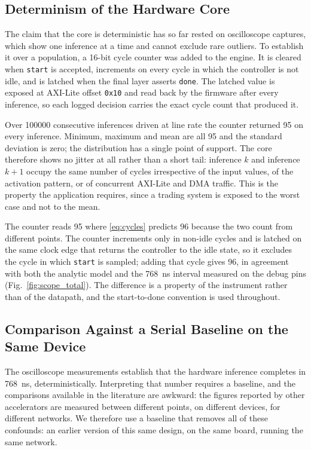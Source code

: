 \documentclass[final,5p,times,twocolumn]{elsarticle}
\begin{document}
\subsection{Determinism of the Hardware Core}
\label{sec:determinism}
The claim that the core is deterministic has so far rested on oscilloscope
captures, which show one inference at a time and cannot exclude rare outliers.
To establish it over a population, a 16-bit cycle counter was added to the
engine. It is cleared when \texttt{start} is accepted, increments on every cycle
in which the controller is not idle, and is latched when the final layer asserts
\texttt{done}. The latched value is exposed at AXI-Lite offset \texttt{0x10} and
read back by the firmware after every inference, so each logged decision carries
the exact cycle count that produced it.

Over \num{100000} consecutive inferences driven at line rate the counter
returned 95 on every inference. Minimum, maximum and mean are all 95 and the
standard deviation is zero; the distribution has a single point of support. The
core therefore shows no jitter at all rather than a short tail: inference $k$ and
inference $k+1$ occupy the same number of cycles irrespective of the input
values, of the activation pattern, or of concurrent AXI-Lite and DMA traffic.
This is the property the application requires, since a trading system is exposed
to the worst case and not to the mean.

The counter reads 95 where \eqref{eq:cycles} predicts 96 because the two count
from different points. The counter increments only in non-idle cycles and is
latched on the same clock edge that returns the controller to the idle state, so
it excludes the cycle in which \texttt{start} is sampled; adding that cycle
gives 96, in agreement with both the analytic model and the
\SI{768}{\nano\second} interval measured on the debug pins
(Fig.~\ref{fig:scope_total}). The difference is a property of the instrument
rather than of the datapath, and the start-to-done convention is used
throughout.

\subsection{Comparison Against a Serial Baseline on the Same Device}
\label{sec:baseline}
The oscilloscope measurements establish that the hardware inference completes in
\SI{768}{\nano\second}, deterministically. Interpreting that number requires a
baseline, and the comparisons available in the literature are awkward: the
figures reported by other accelerators are measured between different points, on
different devices, for different networks. We therefore use a baseline that
removes all of these confounds: an earlier version of this same design, on
the same board, running the same network.
\end{document}
